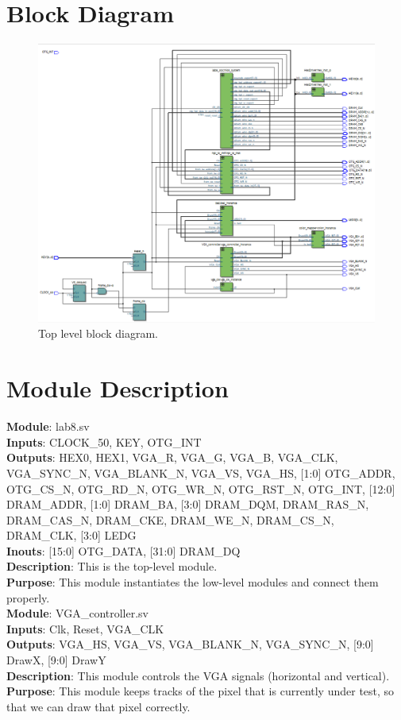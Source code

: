 \documentclass[12pt]{article}
\begin{document}
\section{Block Diagram}
\begin{figure}[H]
    \centering
    \includegraphics[width=15cm]{toplevel.png}
    \caption{Top level block diagram.}
\end{figure}

\section{Module Description}
\textbf{Module}: lab8.sv \\ 
\textbf{Inputs}: CLOCK\_50, KEY, OTG\_INT \\ 
\textbf{Outputs}: HEX0, HEX1, VGA\_R, VGA\_G, VGA\_B, VGA\_CLK, VGA\_SYNC\_N, VGA\_BLANK\_N, VGA\_VS, VGA\_HS, [1:0] OTG\_ADDR, OTG\_CS\_N, OTG\_RD\_N, OTG\_WR\_N, OTG\_RST\_N, OTG\_INT, [12:0] DRAM\_ADDR, [1:0] DRAM\_BA, [3:0] DRAM\_DQM, DRAM\_RAS\_N, DRAM\_CAS\_N, DRAM\_CKE, DRAM\_WE\_N, DRAM\_CS\_N, DRAM\_CLK, [3:0] LEDG \\
\textbf{Inouts}: [15:0] OTG\_DATA, [31:0] DRAM\_DQ \\
\textbf{Description}: This is the top-level module. \\ 
\textbf{Purpose}: This module instantiates the low-level modules and connect them properly. \\

\textbf{Module}: VGA\_controller.sv \\ 
\textbf{Inputs}: Clk, Reset, VGA\_CLK \\ 
\textbf{Outputs}: VGA\_HS, VGA\_VS, VGA\_BLANK\_N, VGA\_SYNC\_N, [9:0] DrawX, [9:0] DrawY \\
\textbf{Description}: This module controls the VGA signals (horizontal and vertical). \\ 
\textbf{Purpose}: This module keeps tracks of the pixel that is currently under test, so that we can draw that pixel correctly. \\
\end{document}
